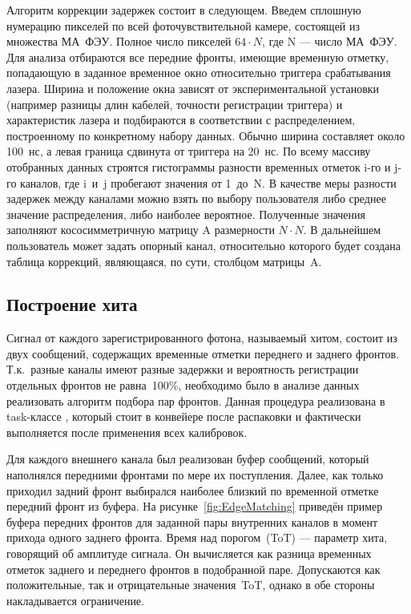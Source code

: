 Алгоритм коррекции задержек состоит в следующем. Введем сплошную нумерацию пикселей по всей фоточувствительной камере, состоящей из множества МА~ФЭУ. Полное число пикселей $ 64 \cdot N $, где N --- число МА~ФЭУ. Для анализа отбираются все передние фронты, имеющие временную отметку, попадающую в заданное временное окно относительно триггера срабатывания лазера. Ширина и положение окна зависят от экспериментальной установки (например разницы длин кабелей, точности регистрации триггера) и характеристик лазера и подбираются в соответствии с распределением, построенному по конкретному набору данных. Обычно ширина составляет около 100~нс, а левая граница сдвинута от триггера на 20~нс. По всему массиву отобранных данных строятся гистограммы разности временных отметок i-го и j-го каналов, где i~и~j пробегают значения от 1~до~N. В качестве меры разности задержек между каналами можно взять по выбору пользователя либо среднее значение распределения, либо наиболее вероятное. Полученные значения заполняют кососимметричную матрицу A размерности $ N \cdot N $. В дальнейшем пользователь может задать опорный канал, относительно которого будет создана таблица коррекций, являющаяся, по сути, столбцом матрицы~A.

\subsection{Построение хита}

Сигнал от каждого зарегистрированного фотона, называемый хитом, состоит из двух сообщений, содержащих временные отметки переднего и заднего фронтов. Т.к.~разные каналы имеют разные задержки и вероятность регистрации отдельных фронтов не равна~100\%, необходимо было в анализе данных реализовать алгоритм подбора пар фронтов. Данная процедура реализована в task-классе , который стоит в конвейере после распаковки и фактически выполняется после применения всех калибровок.

Для каждого внешнего канала был реализован буфер сообщений, который наполнялся передними фронтами по мере их поступления. Далее, как только приходил задний фронт выбирался наиболее близкий по временной отметке передний фронт из буфера. На рисунке~\ref{fig:EdgeMatching} приведён пример буфера передних фронтов для заданной пары внутренних каналов в момент прихода одного заднего фронта. Время над порогом~(ToT) --- параметр хита, говорящий об амплитуде сигнала. Он вычисляется как разница временных отметок заднего и переднего фронтов в подобранной паре. Допускаются как положительные, так и отрицательные значения~ToT, однако в обе стороны накладывается ограничение.

